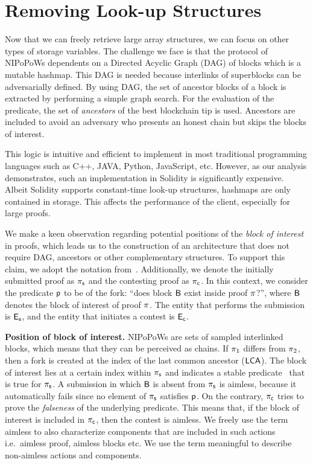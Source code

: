 \section{Removing Look-up Structures}

Now that we can freely retrieve large array structures, we can focus on other
types of storage variables. The challenge we face is that the protocol of
NIPoPoWs dependents on a Directed Acyclic Graph (DAG) of blocks which is a
mutable hashmap. This DAG is needed because interlinks of superblocks can be
adversarially defined. By using DAG, the set of ancestor blocks of a block is
extracted by performing a simple graph search. For the evaluation of the
predicate, the set of \emph{ancestors} of the best blockchain tip is used.
Ancestors are included to avoid an adversary who presents an honest chain but
skips the blocks of interest.

This logic is intuitive and efficient to implement in most traditional
programming languages such as C++, JAVA, Python, JavaScript, etc. However, as
our analysis demonstrates, such an implementation in Solidity is significantly
expensive. Albeit Solidity supports constant-time look-up structures, hashmaps
are only contained in storage. This affects the performance of the client,
especially for large proofs.

We make a keen observation regarding potential positions of the \emph{block of
interest} in proofs, which leads us to the construction of an architecture that
does not require DAG, ancestors or other complementary structures. To support
this claim, we adopt the notation from~\cite{nipopows}.  Additionally, we
denote the initially submitted proof as $\mathsf{\pi_{s}}$ and the contesting proof as
$\mathsf{\pi_{c}}$. In this context, we consider the predicate $\mathsf{p}$ to be of the fork:
``does block $\mathsf{B}$ exist inside proof $\mathsf{\pi}$?'', where $\mathsf{B}$ denotes the block
of interest of proof $\mathsf{\pi}$. The entity that performs the submission is $\mathsf{E_{s}}$,
and the entity that initiates a contest is $\mathsf{E_{c}}$.

\noindent \textbf{Position of block of interest.} NIPoPoWs are sets of sampled
interlinked blocks, which means that they can be perceived as chains. If
$\mathsf{\pi}_1$ differs from $\mathsf{\pi}_2$, then a fork is created at the index of the last
common ancestor ($\mathsf{LCA}$). The block of interest lies at a certain index within
$\mathsf{\pi_{s}}$ and indicates a stable predicate~\cite{nipopows, generic-client} that is
true for $\mathsf{\pi_{s}}$. A submission in which $\mathsf{B}$ is absent from $\mathsf{\pi_{s}}$ is aimless,
because it automatically fails since no element of $\mathsf{\pi_{s}}$ satisfies $\mathsf{p}$. On
the contrary, $\mathsf{\pi_{c}}$ tries to prove the \emph{falseness} of the underlying
predicate. This means that, if the block of interest is included in $\mathsf{\pi_{c}}$,
then the contest is aimless. We freely use the term aimless to also
characterize components that are included in such actions i.e.\ aimless proof,
aimless blocks etc. We use the term meaningful to describe non-aimless actions
and components.


